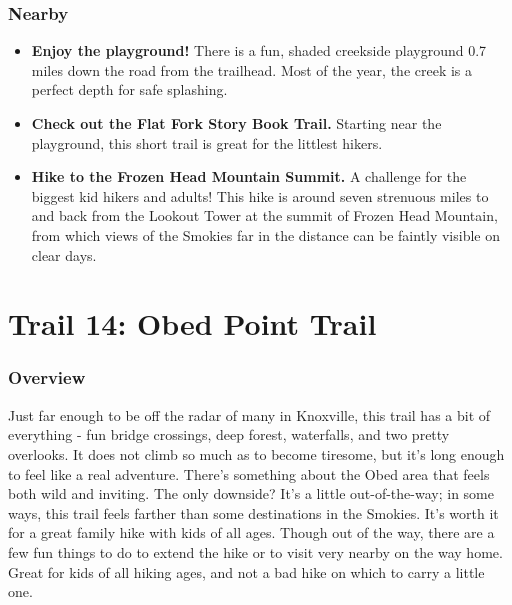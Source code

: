 \documentclass[
  letterpaper,
  DIV=11,
  numbers=noendperiod]{scrreprt}
\providecommand{\tightlist}{%
  \setlength{\itemsep}{0pt}\setlength{\parskip}{0pt}}\usepackage{longtable,booktabs,array}
\begin{document}
\subsection{Nearby}\label{nearby-12}

\begin{itemize}
\tightlist
\item
  \textbf{Enjoy the playground!} There is a fun, shaded creekside
  playground 0.7 miles down the road from the trailhead. Most of the
  year, the creek is a perfect depth for safe splashing.
\item
  \textbf{Check out the Flat Fork Story Book Trail.} Starting near the
  playground, this short trail is great for the littlest hikers.
\item
  \textbf{Hike to the Frozen Head Mountain Summit.} A challenge for the
  biggest kid hikers and adults! This hike is around seven strenuous
  miles to and back from the Lookout Tower at the summit of Frozen Head
  Mountain, from which views of the Smokies far in the distance can be
  faintly visible on clear days.
\end{itemize}

\chapter{Trail 14: Obed Point Trail}\label{trail-14-obed-point-trail}

\subsection{Overview}\label{overview-14}

Just far enough to be off the radar of many in Knoxville, this trail has
a bit of everything - fun bridge crossings, deep forest, waterfalls, and
two pretty overlooks. It does not climb so much as to become tiresome,
but it's long enough to feel like a real adventure. There's something
about the Obed area that feels both wild and inviting. The only
downside? It's a little out-of-the-way; in some ways, this trail feels
farther than some destinations in the Smokies. It's worth it for a great
family hike with kids of all ages. Though out of the way, there are a
few fun things to do to extend the hike or to visit very nearby on the
way home. Great for kids of all hiking ages, and not a bad hike on which
to carry a little one.
\end{document}
